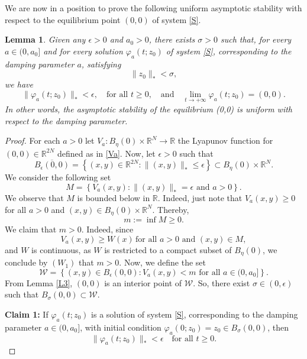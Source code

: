 \documentclass[12pt]{amsart}
\numberwithin{equation}{section}
\newtheorem{lemma}[theorem]{Lemma}
\begin{document}
We are now in a position to prove the following uniform asymptotic stability with respect to the equilibrium point $(0,0)$ of system \eqref{S}.

\begin{lemma}\label{L5}
Given any $\epsilon > 0$ and $a_0>0$, there exists $\sigma > 0$ such that, for every $a\in (0,a_0]$ and for every solution $\varphi_a(t;z_0)$ of system \eqref{S}, corresponding to the damping parameter $a$, satisfying
$$
\|z_0\|_* < \sigma,
$$
we have
$$
\|\varphi_a(t;z_0)\|_* < \epsilon, \quad \text{for all } t \geq 0,\quad \text{and}\quad \lim_{t \to +\infty} \varphi_a(t;z_0) = (0,0).
$$
In other words, the asymptotic stability of the equilibrium (0,0) is uniform with respect to the damping parameter.
\end{lemma}
\begin{proof}
For each $a>0$ let $V_a:B_\eta(0)\times \mathbb{R}^N\to \mathbb{R}$ the Lyapunov function for $(0,0) \in \mathbb{R}^{2N}$ defined as in \eqref{Va}. Now, let $\epsilon > 0$ such that
$$
\overline{B_\epsilon(0,0)} = \left\{ (x,y) \in \mathbb{R}^{2N} : \|(x,y)\|_* \leq \epsilon \right\} \subset B_\eta(0)\times \mathbb{R}^N.
$$
We consider the following set 
$$
M = \left\{ V_a(x,y) : \|(x,y)\|_* = \epsilon \text{ and } a>0 \right\}.
$$
We observe that $M$ is bounded below in $\mathbb{R}$. Indeed, just note that $V_a(x,y)\ge 0$ for all $a>0$ and $(x,y)\in B_\eta(0)\times \mathbb{R}^N$. Thereby, 
$$
m := \inf M \geq 0.
$$
We claim that $m > 0$. Indeed, since 
$$
V_a(x,y)\ge W(x)\,\text{for all } a>0\text{ and }(x,y)\in M,
$$
and $W$ is continuous, as $W$ is restricted to a compact subset of $B_\eta(0)$, we conclude by \hyperlink{W1}{$(W_1)$} that $m > 0$. Now, we define the set
$$
\mathcal{W}= \left\{ (x,y) \in B_\epsilon(0,0) : V_a(x,y) < m \text{ for all }a\in (0,a_0]\right\}.
$$
From Lemma \ref{L3}, $(0,0)$ is an interior point of $\mathcal{W}$. So, there exist $\sigma  \in (0, \epsilon)$ such that $B_\sigma(0,0) \subset \mathcal{W}$.
	
\noindent\textbf{\hypertarget{C1}{Claim 1:}} If $\varphi_a(t;z_0)$ is a solution of system \eqref{S}, corresponding to the damping parameter $a\in (0,a_0]$, with initial condition $ \varphi_a(0;z_0)=z_0\in B_\sigma (0,0)$, then
$$
\|\varphi_a(t;z_0)\|_* < \epsilon \quad \text{for all } t \geq 0.
$$


\end{proof}
\end{document}
